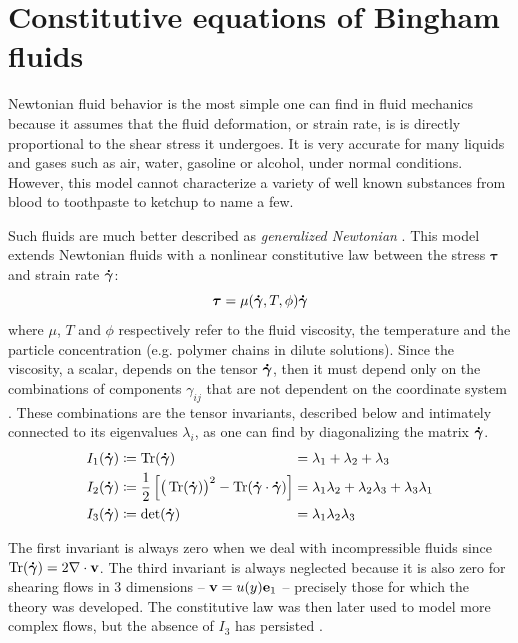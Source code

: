 \documentclass[11 pt]{report}
\begin{document}
\section{Constitutive equations of Bingham fluids}

Newtonian fluid behavior is the most simple one can find in fluid mechanics because it assumes that the fluid deformation, or strain rate, is is directly proportional to the shear stress it undergoes. It is very accurate for many liquids and gases such as air, water, gasoline or alcohol, under normal conditions. However, this model cannot characterize a variety of well known substances from blood to toothpaste to ketchup to name a few.

Such fluids are much better described as \textit{generalized Newtonian} \cite{Geophysical}. This model extends Newtonian fluids with a nonlinear constitutive law between the stress $\boldsymbol\tau$ and strain rate $\boldsymbol{\dot \gamma}$:
\begin{equation}
    \boldsymbol\tau = \mu(\boldsymbol{\dot \gamma}, T, \phi) \boldsymbol{\dot \gamma}
    \label{eq:power-law}
\end{equation}
where $\mu$, $T$ and $\phi$ respectively refer to the fluid viscosity, the temperature and the particle concentration (e.g. polymer chains in dilute solutions). Since the viscosity, a scalar, depends on the tensor $\boldsymbol{\dot \gamma}$, then it must depend only on the combinations of components $\gamma_{ij}$ that are not dependent on the coordinate system \cite{bird1987dynamics}. These combinations are the tensor invariants, described below and intimately connected to its eigenvalues $\lambda_i$, as one can find by diagonalizing the matrix $\boldsymbol{\dot \gamma}$.
\begin{equation}
    \begin{alignedat}{2}
        I_1(\boldsymbol{\dot \gamma}) &\coloneqq \Tr(\boldsymbol{\dot \gamma}) &&= \lambda_1 + \lambda_2 + \lambda_3\\
        I_2(\boldsymbol{\dot \gamma}) &\coloneqq \frac{1}{2} \left[\big(\Tr(\boldsymbol{\dot \gamma})\big)^2 - \Tr(\boldsymbol{\dot \gamma} \cdot \boldsymbol{\dot \gamma})\right] &&= \lambda_1\lambda_2 + \lambda_2\lambda_3 + \lambda_3\lambda_1\\
        I_3(\boldsymbol{\dot \gamma}) &\coloneqq \det(\boldsymbol{\dot \gamma}) &&= \lambda_1\lambda_2\lambda_3
    \end{alignedat}
\end{equation}

The first invariant is always zero when we deal with incompressible fluids since $\Tr(\boldsymbol{\dot \gamma}) = 2 \nabla \cdot \mathbf{v}$. The third invariant is always neglected because it is also zero for shearing flows in 3 dimensions -- $\mathbf{v} = u(y)\mathbf{e}_1$ -- precisely those for which the theory was developed. The constitutive law was then later used to model more complex flows, but the absence of $I_3$ has persisted \cite{bird1987dynamics}.
\end{document}
